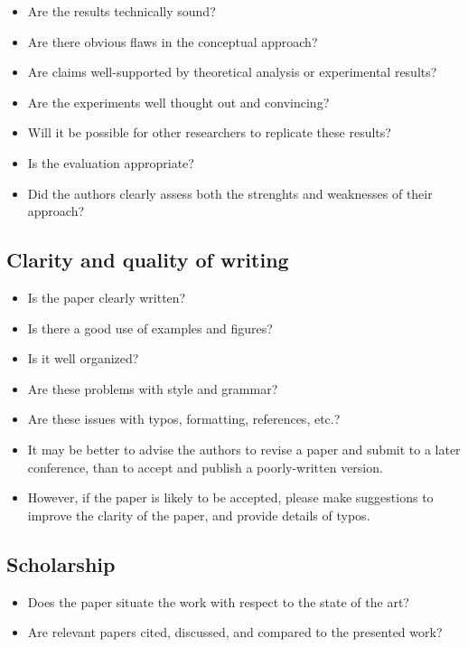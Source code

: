 \documentclass[a4paper]{article}
\begin{document}
\begin{itemize}
	\item Are the results technically sound?
	\item Are there obvious flaws in the conceptual approach?
	\item Are claims well-supported by theoretical analysis or experimental results?
	\item Are the experiments well thought out and convincing?
	\item Will it be possible for other researchers to replicate these results?
	\item Is the evaluation appropriate?
	\item Did the authors clearly assess both the strenghts and weaknesses of their approach?
\end{itemize}

\subsection{Clarity and quality of writing}

\begin{itemize}
	\item Is the paper clearly written?
	\item Is there a good use of examples and figures?
	\item Is it well organized?
	\item Are these problems with style and grammar?
	\item Are these issues with typos, formatting, references, etc.?
	\item It may be better to advise the authors to revise a paper and submit to a later conference, than to accept and publish a poorly-written version.
	\item However, if the paper is likely to be accepted, please make suggestions to improve the clarity of the paper, and provide details of typos.
\end{itemize}

\subsection{Scholarship}

\begin{itemize}
	\item Does the paper situate the work with respect to the state of the art?
	\item Are relevant papers cited, discussed, and compared to the presented work?
\end{itemize}
\end{document}
